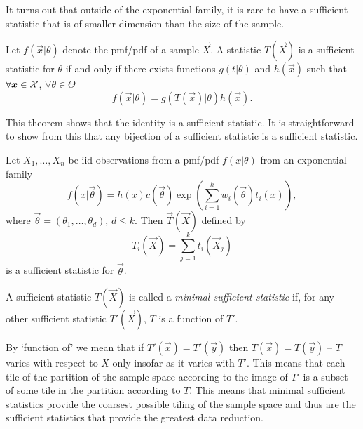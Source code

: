 \begin{remark}
    It turns out that outside of the exponential family, it is rare to have a sufficient statistic that is of smaller dimension than the size of the sample.
\end{remark}

\begin{theorem}
    Let $f(\vec{x} \vert{} \theta)$ denote the pmf/pdf of a sample $\vec{X}$. A statistic $T(\vec{X})$ is a sufficient statistic for $\theta$ if and only if there exists functions $g(t \vert{} \theta)$ and $h(\vec{x})$ such that $\forall \bm{x} \in \mathcal{X}{}$, $\forall \theta \in \Theta$
    \[
        f(\vec{x} \vert{} \theta) = g(T(\vec{x}) \vert{} \theta)h(\vec{x}).
    \]
\end{theorem}

\begin{remark}
    This theorem shows that the identity is a sufficient statistic. It is straightforward to show from this that any bijection of a sufficient statistic is a sufficient statistic.
\end{remark}

\begin{theorem}
    Let $X_1, \dots, X_n$ be iid observations from a pmf/pdf $f(x \vert{} \theta)$ from an exponential family 
    \[
        f(x|\vec{\theta}) = h(x)c(\vec{\theta})\exp\left( \sum_{i=1}^k w_i(\vec{\theta}) t_i(x) \right),
    \]
    where $\vec{\theta} = (\theta_1, \dots, \theta_d)$, $d \leq k$. Then $\vec{T}(\vec{X})$ defined by
    \[
        T_i(\vec{X}) = \sum_{j=1}^k t_i(\vec{X}_j)
    \]
    is a sufficient statistic for $\vec{\theta}$.
\end{theorem}

\begin{definition}
    A sufficient statistic $T(\vec{X})$ is called a \emph{minimal sufficient statistic} if, for any other sufficient statistic $T'(\vec{X})$, $T$ is a function of $T'$.
\end{definition}

\begin{remark}
    By `function of' we mean that if $T'(\vec{x}) = T'(\vec{y})$ then $T(\vec{x}) = T(\vec{y})$ -- $T$ varies with respect to $X$ only insofar as it varies with $T'$. This means that each tile of the partition of the sample space according to the image of $T'$ is a subset of some tile in the partition according to $T$. This means that minimal sufficient statistics provide the coarsest possible tiling of the sample space and thus are the sufficient statistics that provide the greatest data reduction.
\end{remark}

